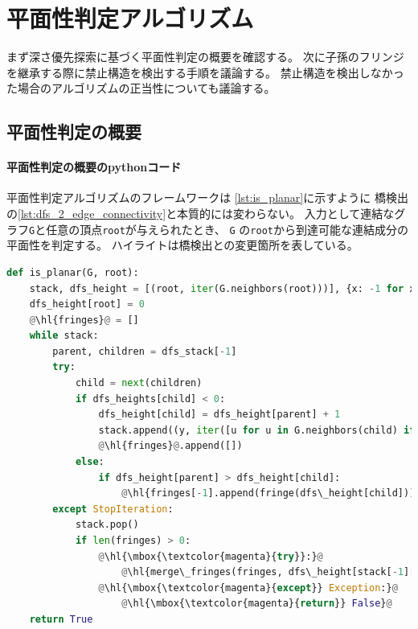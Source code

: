 \section{平面性判定アルゴリズム}
まず深さ優先探索に基づく平面性判定の概要を確認する。
次に子孫のフリンジを継承する際に禁止構造を検出する手順を議論する。
禁止構造を検出しなかった場合のアルゴリズムの正当性についても議論する。


\subsection{平面性判定の概要}%

\paragraph{平面性判定の概要のpythonコード}
平面性判定アルゴリズムのフレームワークは
\lstrefname\ref{lst:is_planar}に示すように
橋検出の\lstrefname\ref{lst:dfs_2_edge_connectivity}と本質的には変わらない。
入力として連結なグラフ{\tt G}と任意の頂点{\tt root}が与えられたとき、
{\tt G} の{\tt root}から到達可能な連結成分の平面性を判定する。
ハイライトは橋検出との変更箇所を表している。








\begin{lstlisting}[language=Python, caption=is\_planar,escapechar=@,
                   label=lst:is_planar]
def is_planar(G, root):
    stack, dfs_height = [(root, iter(G.neighbors(root)))], {x: -1 for x in G}
    dfs_height[root] = 0
    @\hl{fringes}@ = []
    while stack:
        parent, children = dfs_stack[-1]
        try:
            child = next(children)
            if dfs_heights[child] < 0:
                dfs_height[child] = dfs_height[parent] + 1
                stack.append((y, iter([u for u in G.neighbors(child) if u != parent])))
                @\hl{fringes}@.append([])
            else:
                if dfs_height[parent] > dfs_height[child]:
                    @\hl{fringes[-1].append(fringe(dfs\_height[child]))}@
        except StopIteration:
            stack.pop()
            if len(fringes) > 0:
                @\hl{\mbox{\textcolor{magenta}{try}}:}@
                    @\hl{merge\_fringes(fringes, dfs\_height[stack[-1][0]])}@
                @\hl{\mbox{\textcolor{magenta}{except}} Exception:}@
                    @\hl{\mbox{\textcolor{magenta}{return}} False}@
    return True                   
\end{lstlisting}

